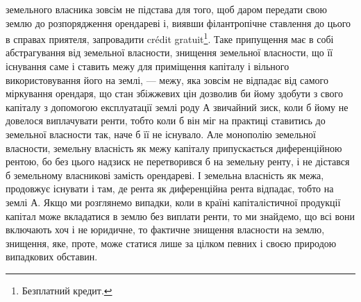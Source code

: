 \parcont{}  %
земельного власника зовсім не підстава для того, щоб даром передати свою землю
до розпорядження орендареві і, виявши філантропічне ставлення до цього в
справах приятеля, запровадити crédit gratuit\footnote*{
Безплатний кредит. 
}. Таке припущення має в собі
абстрагування від земельної власности, знищення земельної власности, що її
існування саме і ставить межу для приміщення капіталу і вільного використовування
його на землі, — межу, яка зовсім не відпадає від самого міркування
орендаря, що стан збіжжевих цін дозволив би йому здобути з свого
капіталу з допомогою експлуатації землі роду $А$ звичайний зиск, коли б йому
не довелося виплачувати ренти, тобто коли б він міг на практиці ставитись до
земельної власности так, наче б її не існувало. Але монополію земельної власности,
земельну власність як межу капіталу припускається диференційною
рентою, бо без цього надзиск не перетворився б на земельну ренту, і не дістався
б земельному власникові замість орендареві. І земельна власність як межа,
продовжує існувати і там, де рента як диференційна рента відпадає, тобто на
землі $А$. Якщо ми розглянемо випадки, коли в країні капіталістичної продукції
капітал може вкладатися в землю без виплати ренти, то ми знайдемо, що всі
вони включають хоч і не юридичне, то фактичне знищення власности на землю,
знищення, яке, проте, може статися лише за цілком певних і своєю природою
випадкових обставин.

